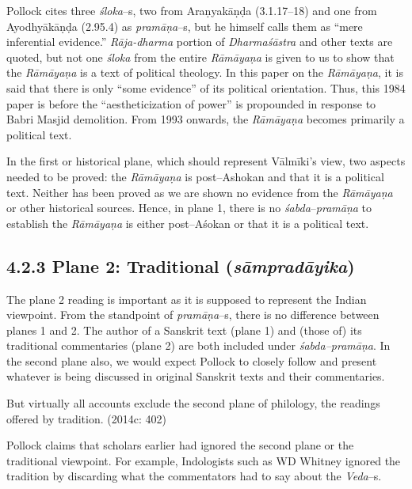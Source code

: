 Pollock cites three \textit{śloka}–s, two from Araṇyakāṇḍa (3.1.17–18) and one from Ayodhyākāṇḍa (2.95.4) as \textit{pramāṇa}–s, but he himself calls them as “mere inferential evidence.” \textit{Rāja-dharma} portion of \textit{Dharmaśāstra} and other texts are quoted, but not one \textit{śloka} from the entire \textit{Rāmāyaṇa} is given to us to show that the \textit{Rāmāyaṇa} is a text of political theology. In this paper on the \textit{Rāmāyaṇa}, it is said that there is only “some evidence” of its political orientation. Thus, this 1984 paper is before the “aestheticization of power” is propounded in response to Babri Masjid demolition. From 1993 onwards, the \textit{Rāmāyaṇa} becomes primarily a political text.

In the first or historical plane, which should represent Vālmīki’s view, two aspects needed to be proved: the \textit{Rāmāyaṇa} is post–Ashokan and that it is a political text. Neither has been proved as we are shown no evidence from the \textit{Rāmāyaṇa} or other historical sources. Hence, in plane 1, there is no \textit{śabda}–\textit{pramāṇa} to establish the \textit{Rāmāyaṇa} is either post–Aśokan or that it is a political text.

\vspace{-.2cm}

\subsection*{4.2.3 Plane 2: Traditional ({\it {\bfseries sāmpradāyika}})}

The plane 2 reading is important as it is supposed to represent the Indian viewpoint. From the standpoint of \textit{pramāṇa}–s, there is no difference between planes 1 and 2. The author of a Sanskrit text (plane 1) and (those of) its traditional commentaries (plane 2) are both included under \textit{śabda–pramāṇa}. In the second plane also, we would expect Pollock to closely follow and present whatever is being discussed in original Sanskrit texts and their commentaries.

\begin{myquote}
But virtually all accounts exclude the second plane of philology, the readings offered by tradition. (2014c: 402)
\end{myquote}

Pollock claims that scholars earlier had ignored the second plane or the traditional viewpoint. For example, Indologists such as WD Whitney ignored the tradition by discarding what the commentators had to say about the \textit{Veda}–s.

